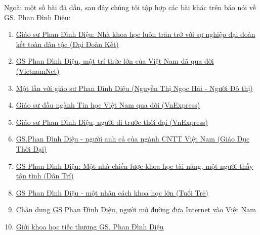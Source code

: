 
Ngoài một số bài đã dẫn, sau đây chúng tôi tập hợp các bài khác trên báo nói về GS. Phan Đình Diệu:  
\begin{enumerate}

\item \href{http://daidoanket.vn/giao-su-phan-dinh-dieu-nha-khoa-hoc-luon-tran-tro-voi-su-nghiep-dai-doan-ket-toan-dan-toc-435683.html}{Giáo sư Phan Đình Diệu: Nhà khoa học luôn trăn trở với sự nghiệp đại đoàn kết toàn dân tộc (Đại Đoàn Kết)}

\item \href{https://vietnamnet.vn/vn/giao-duc/khoa-hoc/gs-phan-dinh-dieu-qua-doi-450739.html}{GS Phan Đình Diệu, một trí thức lớn của Việt Nam đã qua đời (VietnamNet)}

\item \href{https://rosetta.vn/short/2018/05/14/mot-lan-voi-giao-su-phan-dinh-dieu/}{Một lần với giáo sư Phan Đình Diệu (Nguyễn Thị Ngọc Hải - Người Đô thị)}
\item \href{https://vnexpress.net/giao-su-dau-nganh-tin-hoc-viet-nam-qua-doi-3749477.html}{Giáo sư đầu ngành Tin học Việt Nam qua đời (VnExpress)}

\item \href{https://vnexpress.net/giao-su-phan-dinh-dieu-nguoi-di-truoc-thoi-dai-3751125.html}{Giáo sư Phan Đình Diệu, người đi trước thời đại (VnExpress)}

\item \href{https://giaoducthoidai.vn/khoa-hoc/gs-phan-dinh-dieu-nguoi-anh-ca-cua-nganh-cntt-viet-nam-3739514.html}{GS.Phan Đình Diệu - người anh cả của ngành CNTT Việt Nam (Giáo Dục Thời Đại)}

\item \href{https://dantri.com.vn/giao-duc-huong-nghiep/gs-phan-dinh-dieu-mot-nha-chien-luoc-khoa-hoc-tai-nang-mot-nguoi-thay-tan-tinh-20180514191614623.htm}{GS Phan Đình Diệu: Một nhà chiến lược khoa học tài năng, một người thầy tận tình (Dân Trí)}


\item \href{https://tuoitre.vn/gs-phan-dinh-dieu-mot-nhan-cach-khoa-hoc-lon-20180515090511527.htm}{GS Phan Đình Diệu - một nhân cách khoa học lớn (Tuổi Trẻ)}
\item \href{https://vietnamfinance.vn/chan-dung-gs-phan-dinh-dieu-nguoi-mo-duong-dua-internet-vao-viet-nam-20180504224207059.htm}{Chân dung GS Phan Đình Diệu, người mở đường đưa Internet vào Việt Nam}

\item \href{https://hanoitv.vn/gioi-khoa-hoc-tiec-thuong-gs-phan-dinh-dieu-d90514.html}{Giới khoa học tiếc thương GS. Phan Đình Diệu}


\end{enumerate}
